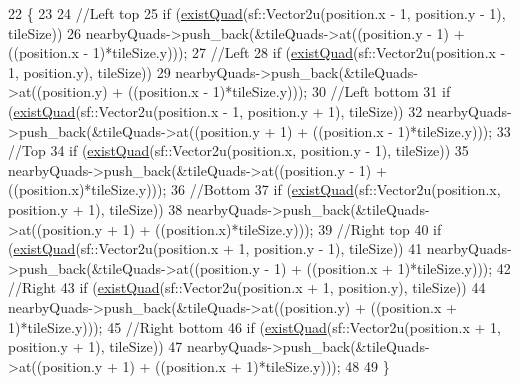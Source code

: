 \begin{DoxyCode}
22 \{
23 
24     \textcolor{comment}{//Left top}
25     \textcolor{keywordflow}{if} (\mbox{\hyperlink{class_utility_a65721c1ad255c50823139ad357212a13}{existQuad}}(sf::Vector2u(position.x - 1, position.y - 1), tileSize))
26         nearbyQuads->push\_back(&tileQuads->at((position.y - 1) + ((position.x - 1)*tileSize.y)));
27     \textcolor{comment}{//Left}
28     \textcolor{keywordflow}{if} (\mbox{\hyperlink{class_utility_a65721c1ad255c50823139ad357212a13}{existQuad}}(sf::Vector2u(position.x - 1, position.y), tileSize))
29         nearbyQuads->push\_back(&tileQuads->at((position.y) + ((position.x - 1)*tileSize.y)));
30     \textcolor{comment}{//Left bottom}
31     \textcolor{keywordflow}{if} (\mbox{\hyperlink{class_utility_a65721c1ad255c50823139ad357212a13}{existQuad}}(sf::Vector2u(position.x - 1, position.y + 1), tileSize))
32         nearbyQuads->push\_back(&tileQuads->at((position.y + 1) + ((position.x - 1)*tileSize.y)));
33     \textcolor{comment}{//Top}
34     \textcolor{keywordflow}{if} (\mbox{\hyperlink{class_utility_a65721c1ad255c50823139ad357212a13}{existQuad}}(sf::Vector2u(position.x, position.y - 1), tileSize))
35         nearbyQuads->push\_back(&tileQuads->at((position.y - 1) + ((position.x)*tileSize.y)));
36     \textcolor{comment}{//Bottom}
37     \textcolor{keywordflow}{if} (\mbox{\hyperlink{class_utility_a65721c1ad255c50823139ad357212a13}{existQuad}}(sf::Vector2u(position.x, position.y + 1), tileSize))
38         nearbyQuads->push\_back(&tileQuads->at((position.y + 1) + ((position.x)*tileSize.y)));
39     \textcolor{comment}{//Right top}
40     \textcolor{keywordflow}{if} (\mbox{\hyperlink{class_utility_a65721c1ad255c50823139ad357212a13}{existQuad}}(sf::Vector2u(position.x + 1, position.y - 1), tileSize))
41         nearbyQuads->push\_back(&tileQuads->at((position.y - 1) + ((position.x + 1)*tileSize.y)));
42     \textcolor{comment}{//Right}
43     \textcolor{keywordflow}{if} (\mbox{\hyperlink{class_utility_a65721c1ad255c50823139ad357212a13}{existQuad}}(sf::Vector2u(position.x + 1, position.y), tileSize))
44         nearbyQuads->push\_back(&tileQuads->at((position.y) + ((position.x + 1)*tileSize.y)));
45     \textcolor{comment}{//Right bottom}
46     \textcolor{keywordflow}{if} (\mbox{\hyperlink{class_utility_a65721c1ad255c50823139ad357212a13}{existQuad}}(sf::Vector2u(position.x + 1, position.y + 1), tileSize))
47         nearbyQuads->push\_back(&tileQuads->at((position.y + 1) + ((position.x + 1)*tileSize.y)));
48 
49 \}
\end{DoxyCode}
\mbox{\label{class_utility_a1737e13071619724884c55559c34d727}} 
